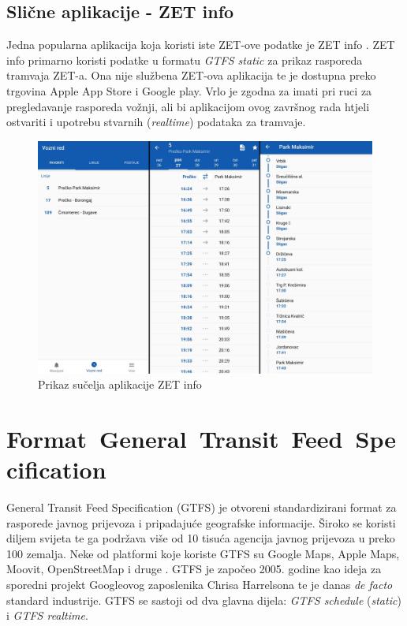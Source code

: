 \documentclass[zavrsnirad]{fer}
\begin{document}
\section{Slične aplikacije - ZET info}
Jedna popularna aplikacija koja koristi iste ZET-ove podatke je ZET info \cite{ZET-info}. ZET info primarno koristi podatke u formatu \textit{GTFS static} za prikaz rasporeda tramvaja ZET-a. Ona nije službena ZET-ova aplikacija te je dostupna preko trgovina Apple App Store i Google play. Vrlo je zgodna za imati pri ruci za pregledavanje rasporeda vožnji, ali bi aplikacijom ovog završnog rada htjeli ostvariti i upotrebu stvarnih (\textit{realtime}) podataka za tramvaje.

\begin{figure}[H]
	\centering
	\includegraphics[width=0.9\linewidth]{Figures/zetinfo.png} 
	\caption{Prikaz sučelja aplikacije ZET info}
	\label{slk:zet-info}
\end{figure}

\newpage
\chapter{\mbox{Format General Transit Feed Specification}}
\label{sec:GTFS}

General Transit Feed Specification (GTFS) je otvoreni standardizirani format za rasporede
javnog prijevoza i pripadajuće geografske informacije. Široko se koristi diljem svijeta te ga
podržava više od 10 tisuća agencija javnog prijevoza u preko 100 zemalja. Neke od platformi koje
koriste GTFS su Google Maps, Apple Maps, Moovit, OpenStreetMap i druge \cite{GTFS}. GTFS je započeo 2005. godine kao ideja za sporedni projekt Googleovog zaposlenika Chrisa Harrelsona te je danas \textit{de facto} standard industrije. GTFS se sastoji od dva glavna dijela: \textit{GTFS schedule} (\textit{static}) i \textit{GTFS realtime}.
\end{document}
